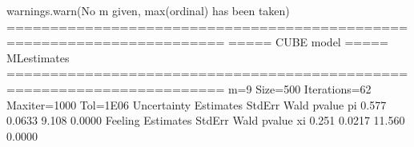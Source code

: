 \documentclass[letterpaper,10pt,english]{sphinxmanual}
\begin{document}
\begin{sphinxVerbatim}[commandchars=\\\{\}]
warnings.warn(\PYGZdq{}No m given, max(ordinal) has been taken\PYGZdq{})
=======================================================================
=====\PYGZgt{}\PYGZgt{}\PYGZgt{} CUBE model \PYGZlt{}\PYGZlt{}\PYGZlt{}===== ML\PYGZhy{}estimates
=======================================================================
m=9  Size=500  Iterations=62  Maxiter=1000  Tol=1E\PYGZhy{}06
\PYGZhy{}\PYGZhy{}\PYGZhy{}\PYGZhy{}\PYGZhy{}\PYGZhy{}\PYGZhy{}\PYGZhy{}\PYGZhy{}\PYGZhy{}\PYGZhy{}\PYGZhy{}\PYGZhy{}\PYGZhy{}\PYGZhy{}\PYGZhy{}\PYGZhy{}\PYGZhy{}\PYGZhy{}\PYGZhy{}\PYGZhy{}\PYGZhy{}\PYGZhy{}\PYGZhy{}\PYGZhy{}\PYGZhy{}\PYGZhy{}\PYGZhy{}\PYGZhy{}\PYGZhy{}\PYGZhy{}\PYGZhy{}\PYGZhy{}\PYGZhy{}\PYGZhy{}\PYGZhy{}\PYGZhy{}\PYGZhy{}\PYGZhy{}\PYGZhy{}\PYGZhy{}\PYGZhy{}\PYGZhy{}\PYGZhy{}\PYGZhy{}\PYGZhy{}\PYGZhy{}\PYGZhy{}\PYGZhy{}\PYGZhy{}\PYGZhy{}\PYGZhy{}\PYGZhy{}\PYGZhy{}\PYGZhy{}\PYGZhy{}\PYGZhy{}\PYGZhy{}\PYGZhy{}\PYGZhy{}\PYGZhy{}\PYGZhy{}\PYGZhy{}\PYGZhy{}\PYGZhy{}\PYGZhy{}\PYGZhy{}\PYGZhy{}\PYGZhy{}\PYGZhy{}\PYGZhy{}
Uncertainty
     Estimates  StdErr    Wald  p\PYGZhy{}value
pi       0.577  0.0633   9.108   0.0000
\PYGZhy{}\PYGZhy{}\PYGZhy{}\PYGZhy{}\PYGZhy{}\PYGZhy{}\PYGZhy{}\PYGZhy{}\PYGZhy{}\PYGZhy{}\PYGZhy{}\PYGZhy{}\PYGZhy{}\PYGZhy{}\PYGZhy{}\PYGZhy{}\PYGZhy{}\PYGZhy{}\PYGZhy{}\PYGZhy{}\PYGZhy{}\PYGZhy{}\PYGZhy{}\PYGZhy{}\PYGZhy{}\PYGZhy{}\PYGZhy{}\PYGZhy{}\PYGZhy{}\PYGZhy{}\PYGZhy{}\PYGZhy{}\PYGZhy{}\PYGZhy{}\PYGZhy{}\PYGZhy{}\PYGZhy{}\PYGZhy{}\PYGZhy{}\PYGZhy{}\PYGZhy{}\PYGZhy{}\PYGZhy{}\PYGZhy{}\PYGZhy{}\PYGZhy{}\PYGZhy{}\PYGZhy{}\PYGZhy{}\PYGZhy{}\PYGZhy{}\PYGZhy{}\PYGZhy{}\PYGZhy{}\PYGZhy{}\PYGZhy{}\PYGZhy{}\PYGZhy{}\PYGZhy{}\PYGZhy{}\PYGZhy{}\PYGZhy{}\PYGZhy{}\PYGZhy{}\PYGZhy{}\PYGZhy{}\PYGZhy{}\PYGZhy{}\PYGZhy{}\PYGZhy{}\PYGZhy{}
Feeling
     Estimates  StdErr    Wald  p\PYGZhy{}value
xi       0.251  0.0217  11.560   0.0000
\PYGZhy{}\PYGZhy{}\PYGZhy{}\PYGZhy{}\PYGZhy{}\PYGZhy{}\PYGZhy{}\PYGZhy{}\PYGZhy{}\PYGZhy{}\PYGZhy{}\PYGZhy{}\PYGZhy{}\PYGZhy{}\PYGZhy{}\PYGZhy{}\PYGZhy{}\PYGZhy{}\PYGZhy{}\PYGZhy{}\PYGZhy{}\PYGZhy{}\PYGZhy{}\PYGZhy{}\PYGZhy{}\PYGZhy{}\PYGZhy{}\PYGZhy{}\PYGZhy{}\PYGZhy{}\PYGZhy{}\PYGZhy{}\PYGZhy{}\PYGZhy{}\PYGZhy{}\PYGZhy{}\PYGZhy{}\PYGZhy{}\PYGZhy{}\PYGZhy{}\PYGZhy{}\PYGZhy{}\PYGZhy{}\PYGZhy{}\PYGZhy{}\PYGZhy{}\PYGZhy{}\PYGZhy{}\PYGZhy{}\PYGZhy{}\PYGZhy{}\PYGZhy{}\PYGZhy{}\PYGZhy{}\PYGZhy{}\PYGZhy{}\PYGZhy{}\PYGZhy{}\PYGZhy{}\PYGZhy{}\PYGZhy{}\PYGZhy{}\PYGZhy{}\PYGZhy{}\PYGZhy{}\PYGZhy{}\PYGZhy{}\PYGZhy{}\PYGZhy{}\PYGZhy{}\PYGZhy{}

\end{sphinxVerbatim}
\end{document}
